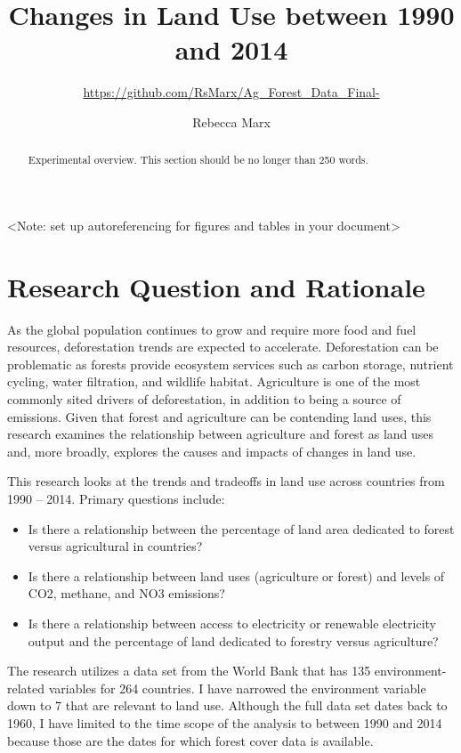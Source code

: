 \documentclass[12pt,]{article}
\title{Changes in Land Use between 1990 and 2014}
\subtitle{\url{https://github.com/RsMarx/Ag_Forest_Data_Final-}}
\author{Rebecca Marx}
\date{}
\providecommand{\tightlist}{%
  \setlength{\itemsep}{0pt}\setlength{\parskip}{0pt}}
\begin{document}
\maketitle
\begin{abstract}
Experimental overview. This section should be no longer than 250 words.
\end{abstract}

\newpage

\tableofcontents  \newpage
\listoftables  \newpage
\listoffigures  \newpage

\textless{}Note: set up autoreferencing for figures and tables in your
document\textgreater{}

\section{Research Question and
Rationale}\label{research-question-and-rationale}

As the global population continues to grow and require more food and
fuel resources, deforestation trends are expected to accelerate.
Deforestation can be problematic as forests provide ecosystem services
such as carbon storage, nutrient cycling, water filtration, and wildlife
habitat. Agriculture is one of the most commonly sited drivers of
deforestation, in addition to being a source of emissions. Given that
forest and agriculture can be contending land uses, this research
examines the relationship between agriculture and forest as land uses
and, more broadly, explores the causes and impacts of changes in land
use.

This research looks at the trends and tradeoffs in land use across
countries from 1990 -- 2014. Primary questions include:

\begin{itemize}
\tightlist
\item
  Is there a relationship between the percentage of land area dedicated
  to forest versus agricultural in countries?
\item
  Is there a relationship between land uses (agriculture or forest) and
  levels of CO2, methane, and NO3 emissions?
\item
  Is there a relationship between access to electricity or renewable
  electricity output and the percentage of land dedicated to forestry
  versus agriculture?
\end{itemize}

The research utilizes a data set from the World Bank that has 135
environment-related variables for 264 countries. I have narrowed the
environment variable down to 7 that are relevant to land use. Although
the full data set dates back to 1960, I have limited to the time scope
of the analysis to between 1990 and 2014 because those are the dates for
which forest cover data is available.
\end{document}
